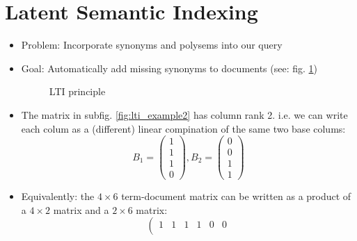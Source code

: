 \documentclass[a4paper]{scrartcl}
\newcommand{\blu}[1]{\textcolor{mainblue}{#1}}
\begin{document}
\section{Latent Semantic Indexing}
\begin{itemize}
\item Problem: Incorporate synonyms and polysems into our query
\item Goal: Automatically add missing synonyms to documents (see: fig. \ref{fig:lti_principle})
  \begin{figure}[h!tbp]
    \centering
    \caption{LTI principle}
    \label{fig:lti_principle}
  \end{figure}
\item The matrix in subfig. \ref{fig:lti_example2} has \blu{column rank 2}. i.e.
  we can write each colum as a (different) linear compination of the same two
  base colums:
  \[B_1=
    \left(
      \begin{array}{c}
        1 \\ 1\\ 1 \\ 0
      \end{array}
    \right), B_2 = \left(
      \begin{array}{c}
        0 \\0 \\1  \\ 1
      \end{array}
  \right)
\]
\item Equivalently: the $4\times 6$ term-document matrix can be written as a
  product of a $4\times 2$ matrix and a $2\times6$ matrix:
  \begin{equation}
    \label{eq:lti_concept}
    \left(
      \begin{array}{cccccc}
        1&1&1&1&0&0 \\

\end{array}
\end{equation}
\end{itemize}
\end{document}
